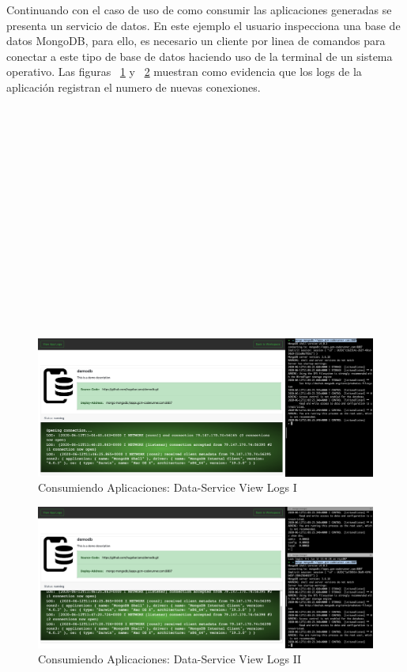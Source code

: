 \documentclass[a4paper,11pt]{book}
\begin{document}
Continuando con el caso de uso de como consumir las aplicaciones generadas se presenta un servicio de datos. En este ejemplo el usuario inspecciona una base de datos MongoDB, para ello, es necesario un cliente por linea de comandos para conectar a este tipo de base de datos haciendo uso de la terminal de un sistema operativo. Las figuras ~\ref{1_14} y ~\ref{1_15} muestran como evidencia que los logs de la aplicación registran el numero de nuevas conexiones. 
~\\
~\\
~\\
~\\
~\\
~\\
~\\
~\\
~\\
~\\
~\\
~\\
~\\
~\\
~\\
~\\
\begin{figure}[H]
\centering
\includegraphics[scale=0.25]{imagenes/casouso_a/1_14.png}
\caption{  Consumiendo Aplicaciones: Data-Service View Logs I  }
\label{1_14}
\end{figure}

\begin{figure}[H]
\centering
\includegraphics[scale=0.25]{imagenes/casouso_a/1_15.png}
\caption{  Consumiendo Aplicaciones: Data-Service View Logs II }
\label{1_15}
\end{figure}
\end{document}
